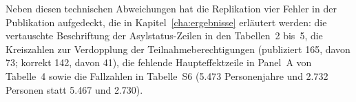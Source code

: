 Neben diesen technischen Abweichungen hat die Replikation vier Fehler in der Publikation aufgedeckt, die in Kapitel~\ref{cha:ergebnisse} erläutert werden: die vertauschte Beschriftung der Asylstatus-Zeilen in den Tabellen~2 bis~5, die Kreiszahlen zur Verdopplung der Teilnahmeberechtigungen (publiziert 165, davon 73; korrekt 142, davon 41), die fehlende Haupteffektzeile in Panel~A von Tabelle~4 sowie die Fallzahlen in Tabelle~S6 (5.473 Personenjahre und 2.732 Personen statt 5.467 und 2.730).
